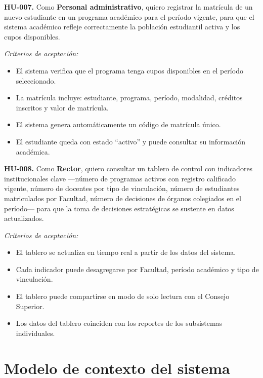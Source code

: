 \bigskip

\textbf{HU-007.} Como \textbf{Personal administrativo}, quiero registrar
la matrícula de un nuevo estudiante en un programa académico para el período
vigente, para que el sistema académico refleje correctamente la población
estudiantil activa y los cupos disponibles.

\textit{Criterios de aceptación:}
\begin{itemize}
  \item El sistema verifica que el programa tenga cupos disponibles en el
    período seleccionado.
  \item La matrícula incluye: estudiante, programa, período, modalidad,
    créditos inscritos y valor de matrícula.
  \item El sistema genera automáticamente un código de matrícula único.
  \item El estudiante queda con estado ``activo'' y puede consultar su
    información académica.
\end{itemize}

\bigskip

\textbf{HU-008.} Como \textbf{Rector}, quiero consultar un tablero de
control con indicadores institucionales clave ---número de programas activos
con registro calificado vigente, número de docentes por tipo de vinculación,
número de estudiantes matriculados por Facultad, número de decisiones de
órganos colegiados en el período--- para que la toma de decisiones
estratégicas se sustente en datos actualizados.

\textit{Criterios de aceptación:}
\begin{itemize}
  \item El tablero se actualiza en tiempo real a partir de los datos del
    sistema.
  \item Cada indicador puede desagregarse por Facultad, período académico
    y tipo de vinculación.
  \item El tablero puede compartirse en modo de solo lectura con el
    Consejo Superior.
  \item Los datos del tablero coinciden con los reportes de los subsistemas
    individuales.
\end{itemize}

\section{Modelo de contexto del sistema}
\label{sec:modelo-contexto}

